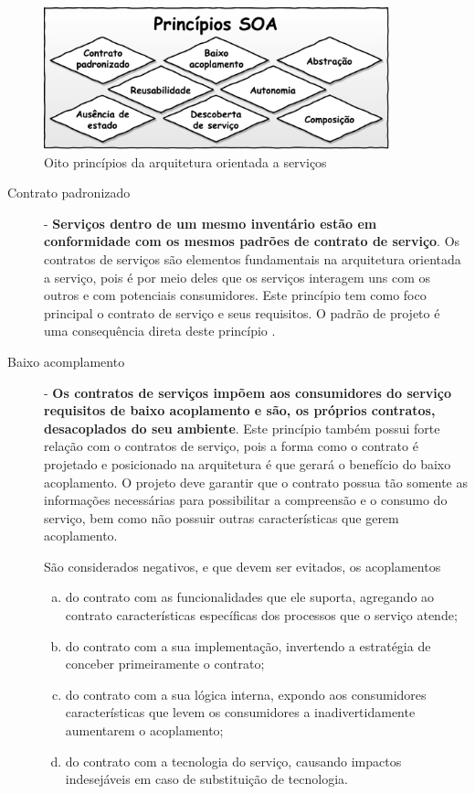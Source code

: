 \begin{figure}[!htb]
\centering
\includegraphics[width=100mm,trim = 0mm 0mm 0mm 
0mm,clip]{img/PrincipiosSOA.pdf}
\caption{Oito princípios da arquitetura orientada a serviços \cite{erl2009web}}
\label{Fig:PrincipiosSoa}
\end{figure}

\begin{description}
\item[Contrato padronizado] - \textbf{Serviços dentro de um mesmo inventário
estão em conformidade com os mesmos padrões de contrato de serviço}.
Os contratos de serviços são elementos fundamentais na arquitetura orientada a
serviço, pois é por meio deles que os serviços interagem uns com os outros e com
potenciais consumidores. Este princípio tem como foco principal o contrato de
serviço e seus requisitos. O padrão de projeto \CtFirst{} é uma
consequência direta deste princípio \cite{erl2009web}.

\item[Baixo acomplamento] - \textbf{Os contratos de serviços impõem aos
consumidores do serviço requisitos de baixo acoplamento e são, os próprios
contratos, desacoplados do seu ambiente}. 
Este princípio também possui forte relação com o contratos de serviço, pois a
forma como o contrato é projetado e posicionado na arquitetura é que gerará o
benefício do baixo acoplamento. O projeto deve garantir que o contrato
possua tão somente as informações necessárias para possibilitar a compreensão e
o consumo do serviço, bem como não possuir outras características que gerem
acoplamento.

São considerados negativos, e que devem ser evitados, os acoplamentos  
\begin{enumerate}[(a)] 
\item do contrato com as funcionalidades que ele suporta, agregando ao
contrato características específicas dos processos que o serviço atende;
\item do contrato com a sua implementação, invertendo a estratégia de conceber
primeiramente o contrato;
\item do contrato com a sua lógica interna, expondo aos consumidores
características que levem os consumidores a inadivertidamente aumentarem o
acoplamento;
\item do contrato com a tecnologia do serviço, causando impactos indesejáveis em
caso de substituição de tecnologia.
\end{enumerate}


\end{description}
